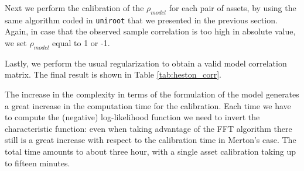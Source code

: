 Next we perform the calibration of the  $\rho_{model}$ for each pair of assets, by using the same algorithm coded in \texttt{uniroot} that we presented  in the  previous section. Again, in case that the observed sample correlation is too high in absolute value, we set $\rho_{model}$ equal to 1 or -1.

Lastly, we perform the usual regularization to obtain a valid model correlation matrix.
The final result is shown in Table \ref{tab:heston_corr}.

\bigskip
The increase in the complexity in terms of the formulation of the model generates a great increase in the computation time for the calibration. Each time we have to compute the (negative) log-likelihood function we need to invert the characteristic function: even when taking advantage of the FFT algorithm there still is a great increase with respect to the calibration time in Merton's case. The total time amounts to about three hour, with a single asset calibration taking up to fifteen minutes.

